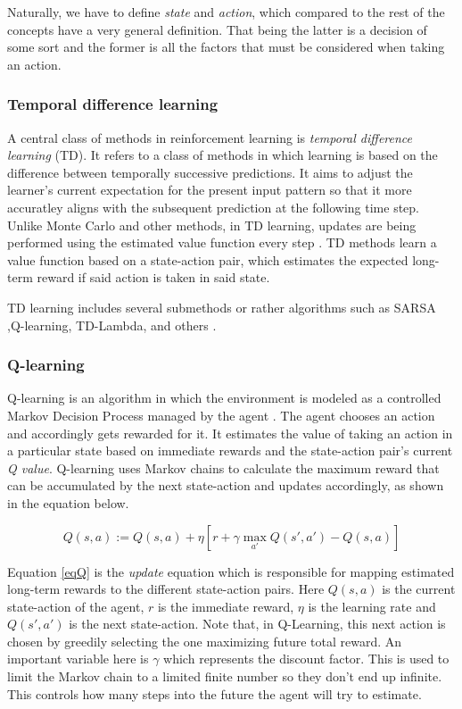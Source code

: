 Naturally, we have to define \textit{state} and \textit{action}, which compared to the rest of the concepts have a very general definition. 
That being the latter is a decision of some sort and the former is all the factors that must be considered when taking an action. 

\subsubsection{Temporal difference learning}

A central class of methods in reinforcement learning is \textit{temporal difference learning} (TD). 
It refers to a class of methods in which learning is based on the difference between temporally successive predictions. 
It aims to adjust the learner's current expectation for the present input pattern so that it more accuratley aligns with the subsequent prediction at the following time step. 
Unlike Monte Carlo and other methods, in TD learning, updates are being performed using the estimated value function every step \cite{tesauro1995temporal}.  
TD methods learn a value function based on a state-action pair, which estimates the expected long-term reward if said action is taken in said state. 

TD learning includes several submethods or rather algorithms such as SARSA ,Q-learning, TD-Lambda, and others \cite{eiben2007reinforcement}.\\

\subsubsection{Q-learning}
Q-learning is an algorithm in which the environment is modeled as a controlled Markov Decision Process managed by the agent \cite{watkins1992q}. 
The agent chooses an action and accordingly gets rewarded for it. 
It estimates the value of taking an action in a particular state based on immediate rewards and the state-action pair's current \textit{Q value}. 
Q-learning uses Markov chains to calculate the maximum reward that can be accumulated by the next state-action and updates accordingly, as shown in the equation below.

\begin{equation} \label{eqQ}
    { Q(s,a) := Q(s,a) + \eta [r + \gamma \max_{a'} Q(s',a') - Q(s,a)]}
\end{equation}

Equation \ref{eqQ} is the \textit{update} equation which is responsible for mapping estimated long-term rewards to the different state-action pairs. 
Here $Q(s,a)$ is the current state-action of the agent, $r$ is the immediate reward, $\eta$ is the learning rate and $Q(s',a')$ is the next state-action. 
Note that, in Q-Learning, this next action is chosen by greedily selecting the one maximizing future total reward.
An important variable here is $\gamma$ which represents the discount factor. This is used to limit the Markov chain to a limited finite number so they don't end up infinite. This controls how many steps into the future the agent will try to estimate. 


